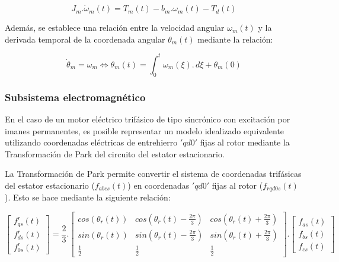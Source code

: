 \documentclass{article}
\begin{document}
        \begin{equation}\label{eq:subsistema_macanico1}
            J_{m}.\dot{\omega}_{m}(t) = T_{m}(t)-b_{m}.\omega_{m}(t)-T_{d}(t)
        \end{equation}
        
        Además, se establece una relación entre la velocidad angular $\omega_m(t)$ y la derivada temporal de la 
        coordenada angular $\theta_m(t)$ mediante la relación:
        
        \begin{equation}\label{eq:subsistema_mecanico2}
            \dot{\theta}_{m} = \omega_{m} \Leftrightarrow \theta_{m}(t) = \int_{0}^{t} \omega_{m}(\xi). \,d\xi + \theta_{m}(0)
        \end{equation}

    \subsubsection{Subsistema electromagnético}
        
    En el caso de un motor eléctrico trifásico de tipo sincrónico con excitación por imanes permanentes, 
    es posible representar un modelo idealizado equivalente utilizando coordenadas eléctricas de 
    entrehierro $'qd0'$ fijas al rotor mediante la Transformación de Park del circuito del estator 
    estacionario.

    La Transformación de Park permite convertir el sistema de coordenadas trifásicas del estator 
    estacionario ($f_{abcs}(t)$) en coordenadas $'qd0'$ fijas al rotor ($f_{rqd0s}(t)$). Esto se hace 
    mediante la siguiente relación:

    \begin{equation}
        \begin{bmatrix}
            f_{qs}^r(t)\\
            f_{ds}^r(t)\\
            f_{0s}^r(t)
        \end{bmatrix}
        =\frac{2}{3}.
        \begin{bmatrix}
            cos(\theta_r(t)) & cos(\theta_r(t) - \frac{2\pi}{3}) & cos(\theta_r(t) + \frac{2\pi}{3})\\
            sin(\theta_r(t)) & sin(\theta_r(t) - \frac{2\pi}{3}) & sin(\theta_r(t) + \frac{2\pi}{3})\\
            \frac{1}{2} & \frac{1}{2} & \frac{1}{2}
        \end{bmatrix}.
        \begin{bmatrix}
            f_{as}(t)\\
            f_{bs}(t)\\
            f_{cs}(t)
        \end{bmatrix}
    \end{equation}
\end{document}
